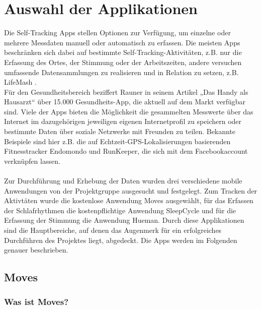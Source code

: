 
\chapter{Auswahl der Applikationen}
\label{ch:Apps}

Die Self-Tracking Apps stellen Optionen zur Verfügung, um einzelne oder mehrere Messdaten manuell oder automatisch zu erfassen. 
Die meisten Apps beschränken sich dabei auf bestimmte Self-Tracking-Aktivitäten, z.B. nur die Erfassung des Ortes, der Stimmung oder der Arbeitszeiten, andere versuchen umfassende Datensammlungen zu realisieren und in Relation zu setzen, z.B. LifeMash \cite{web:SleepCycle}. \\
Für den Gesundheitsbereich beziffert Rauner in seinem Artikel „Das Handy als Hausarzt“ über 15.000 Gesundheits-App, die aktuell auf dem Markt verfügbar sind. 
Viele der Apps bieten die Möglichkeit die gesammelten Messwerte über das Internet im dazugehörigen jeweiligen eigenen Internetprofil zu speichern oder bestimmte Daten über soziale Netzwerke mit Freunden zu teilen. 
Bekannte Beispiele sind hier z.B. die auf Echtzeit-GPS-Lokalisierungen basierenden Fitnesstracker Endomondo und RunKeeper, die sich mit dem Facebookaccount verknüpfen lassen. 
\\
\\
Zur Durchführung und Erhebung der Daten wurden drei verschiedene mobile Anwendungen von der Projektgruppe ausgesucht und festgelegt.
Zum Tracken der Aktivtäten wurde die kostenlose Anwendung Moves ausgewählt, für das Erfassen der Schlafrhythmen die kostenpflichtige Anwendung SleepCycle und für die Erfassung der Stimmung die Anwendung Hueman.
Durch diese Applikationen sind die Hauptbereiche, auf denen das Augenmerk für ein erfolgreiches Durchführen des Projektes liegt, abgedeckt.
Die Apps werden im Folgenden genauer beschrieben.


\section{Moves}
\label{ch:Apps:sec:Moves}

\subsection{Was ist Moves?}
\label{ch:Apps:sec:Moves:subsec:WIM}

